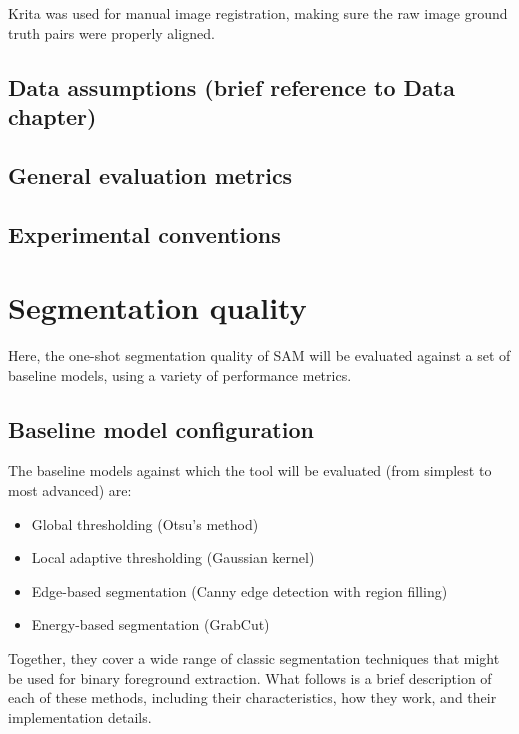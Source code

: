 Krita was used for manual image registration, making sure the raw image ground truth pairs were properly aligned.
\subsection{Data assumptions (brief reference to Data chapter)}
\subsection{General evaluation metrics}
\subsection{Experimental conventions}

\section{Segmentation quality} \label{Segmentation quality}
Here, the one-shot segmentation quality of SAM will be evaluated against a set of baseline models, using a variety of performance metrics.

\noindent{}

\subsection{Baseline model configuration}
The baseline models against which the tool will be evaluated (from simplest to most advanced) are:
\begin{itemize}
    \item Global thresholding (Otsu's method)
    \item Local adaptive thresholding (Gaussian kernel)
    \item Edge-based segmentation (Canny edge detection with region filling)
    \item Energy-based segmentation (GrabCut)
\end{itemize}
Together, they cover a wide range of classic segmentation techniques that might be used for binary foreground extraction.
What follows is a brief description of each of these methods, including their characteristics, how they work, and their implementation details.
